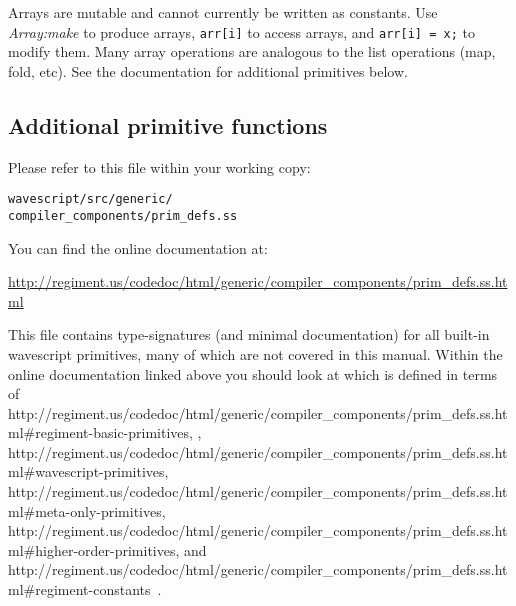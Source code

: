 \documentclass[twocolumn]{report}
\begin{document}
Arrays are mutable and cannot currently be written as constants.  Use
{\em Array:make} to produce arrays, {\tt arr[i]} to access arrays, and
{\tt arr[i] = x;} to modify them.  Many array operations are analogous
to the list operations (map, fold, etc).  See the documentation for
additional primitives below.


\subsection{Additional primitive functions}

Please refer to this file within your working copy:
\vspace{-2mm}
\begin{center}
{\tt{wavescript/src/generic/\\compiler\_components/prim\_defs.ss}}
\end{center}

You can find the online documentation at:
\vspace{-2mm}
\begin{center}
\url{http://regiment.us/codedoc/html/generic/compiler\_components/prim\_defs.ss.html}
\end{center}




This file contains type-signatures (and minimal documentation) for all built-in
wavescript primitives, many of which are not covered in this manual.
Within the online documentation linked above you should look at 
which is defined in terms of 
      {http://regiment.us/codedoc/html/generic/compiler\_components/prim\_defs.ss.html\#regiment-basic-primitives},
,
          {http://regiment.us/codedoc/html/generic/compiler\_components/prim\_defs.ss.html\#wavescript-primitives},
           {http://regiment.us/codedoc/html/generic/compiler\_components/prim\_defs.ss.html\#meta-only-primitives},
        {http://regiment.us/codedoc/html/generic/compiler\_components/prim\_defs.ss.html\#higher-order-primitives},
and
             {http://regiment.us/codedoc/html/generic/compiler\_components/prim\_defs.ss.html\#regiment-constants}~.
\end{document}

